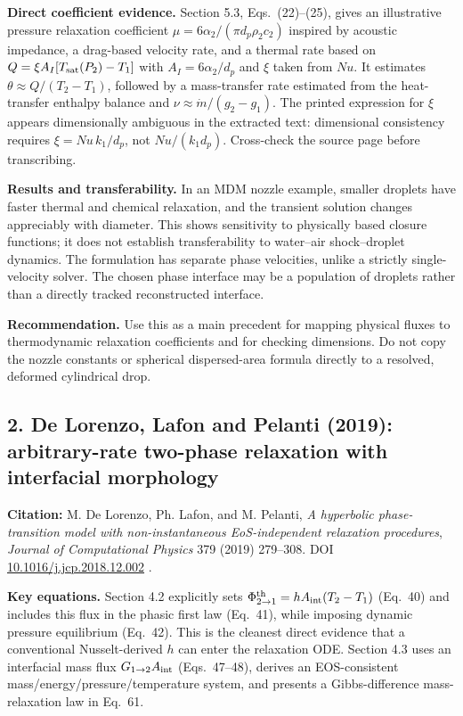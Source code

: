 \documentclass[11pt,letterpaper]{article}
\begin{document}
\textbf{Direct coefficient evidence.} Section 5.3, Eqs.~(22)--(25), gives an illustrative pressure relaxation coefficient $\mu=6\alpha_2/(\pi d_p\rho_2c_2)$ inspired by acoustic impedance, a drag-based velocity rate, and a thermal rate based on $Q=\xi A_I[T_{\rm sat}(P_2)-T_1]$ with $A_I=6\alpha_2/d_p$ and $\xi$ taken from $Nu$. It estimates $\theta\approx Q/(T_2-T_1)$, followed by a mass-transfer rate estimated from the heat-transfer enthalpy balance and $\nu\approx \dot m/(g_2-g_1)$. The printed expression for $\xi$ appears dimensionally ambiguous in the extracted text: dimensional consistency requires $\xi=Nu\,k_1/d_p$, not $Nu/(k_1d_p)$. Cross-check the source page before transcribing.

\textbf{Results and transferability.} In an MDM nozzle example, smaller droplets have faster thermal and chemical relaxation, and the transient solution changes appreciably with diameter. This shows sensitivity to physically based closure functions; it does not establish transferability to water--air shock--droplet dynamics. The formulation has separate phase velocities, unlike a strictly single-velocity solver. The chosen phase interface may be a population of droplets rather than a directly tracked reconstructed interface.

\textbf{Recommendation.} Use this as a main precedent for mapping physical fluxes to thermodynamic relaxation coefficients and for checking dimensions. Do not copy the nozzle constants or spherical dispersed-area formula directly to a resolved, deformed cylindrical drop.

\subsection{2. De Lorenzo, Lafon and Pelanti (2019): arbitrary-rate two-phase relaxation with interfacial morphology}
\textbf{Citation:} M. De Lorenzo, Ph. Lafon, and M. Pelanti, \emph{A hyperbolic phase-transition model with non-instantaneous EoS-independent relaxation procedures}, \emph{Journal of Computational Physics} 379 (2019) 279--308. DOI \href{https://doi.org/10.1016/j.jcp.2018.12.002}{10.1016/j.jcp.2018.12.002} \cite{DeLorenzo2019}.

\textbf{Key equations.} Section 4.2 explicitly sets $\Phi^{\rm th}_{2\to1}=h A_{\rm int}(T_2-T_1)$ (Eq.~40) and includes this flux in the phasic first law (Eq.~41), while imposing dynamic pressure equilibrium (Eq.~42). This is the cleanest direct evidence that a conventional Nusselt-derived $h$ can enter the relaxation ODE. Section 4.3 uses an interfacial mass flux $G_{1\to2}A_{\rm int}$ (Eqs.~47--48), derives an EOS-consistent mass/energy/pressure/temperature system, and presents a Gibbs-difference mass-relaxation law in Eq.~61.
\end{document}
